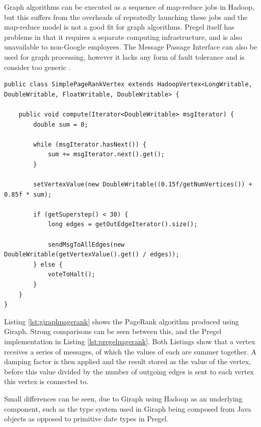 Graph algorithms can be executed as a sequence of map-reduce jobs in Hadoop, but this suffers from the overheads of repeatedly launching these jobs and the map-reduce model is not a good fit for graph algorithms. Pregel itself has problems in that it requires a separate computing infrastructure, and is also unavailable to non-Google employees. The Message Passage Interface can also be used for graph processing, however it lacks any form of fault tolerance and is consider too generic \cite{giraphtalk}.

\begin{lstlisting}[float]
public class SimplePageRankVertex extends HadoopVertex<LongWritable, DoubleWritable, FloatWritable, DoubleWritable> {

	public void compute(Iterator<DoubleWritable> msgIterator) {
		double sum = 0;
		
		while (msgIterator.hasNext()) {
			sum += msgIterator.next().get();
		}
		
		setVertexValue(new DoubleWritable((0.15f/getNumVertices()) + 0.85f * sum);
		
		if (getSuperstep() < 30) {
			long edges = getOutEdgeIterator().size();
			
			sendMsgToAllEdges(new DoubleWritable(getVertexValue().get() / edges));
		} else {
			voteToHalt();
		}
	}
}					
\end{lstlisting}

Listing \ref{lst:giraphpagerank} shows the PageRank algorithm \cite{pagerank} produced using Giraph. Strong comparisons can be seen between this, and the Pregel implementation in Listing \ref{lst:pregelpagerank}. Both Listings show that a vertex receives a series of messages, of which the values of each are summer together. A damping factor is then applied and the result stored as the value of the vertex, before this value divided by the number of outgoing edges is sent to each vertex this vertex is connected to.

Small differences can be seen, due to Giraph using Hadoop as an underlying component, such as the type system used in Giraph being composed from Java objects as opposed to primitive date types in Pregel.